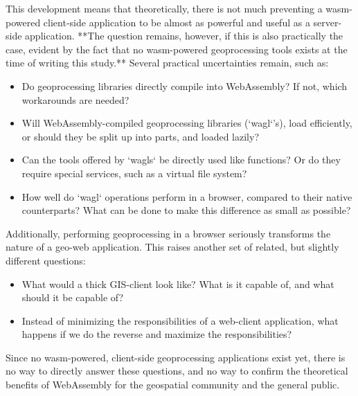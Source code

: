 This development means that theoretically, there is not much preventing a wasm-powered client-side application to be almost as powerful and useful as a server-side application. **The question remains, however, if this is also practically the case, evident by the fact that no wasm-powered geoprocessing tools exists at the time of writing this study.** Several practical uncertainties remain, such as: 
\begin{itemize}
  \item Do geoprocessing libraries directly compile into WebAssembly? If not, which workarounds are needed? 
  \item Will WebAssembly-compiled geoprocessing libraries (`wagl`'s), load efficiently, or should they be split up into parts, and loaded lazily? 
  \item Can the tools offered by `wagls` be directly used like functions? Or do they require special services, such as a virtual file system? 
  \item How well do `wagl` operations perform in a browser, compared to their native counterparts? What can be done to make this difference as small as possible?
\end{itemize}

Additionally, performing geoprocessing in a browser seriously transforms the nature of a geo-web application. This raises another set of related, but slightly different questions:

\begin{itemize}
  \item What would a thick GIS-client look like? What is it capable of, and what should it be capable of?
  \item Instead of minimizing the responsibilities of a web-client application, what happens if we do the reverse and maximize the responsibilities? 
\end{itemize}


Since no wasm-powered, client-side geoprocessing applications exist yet, there is no way to directly answer these questions, and no way to confirm the theoretical benefits of WebAssembly for the geospatial community and the general public.